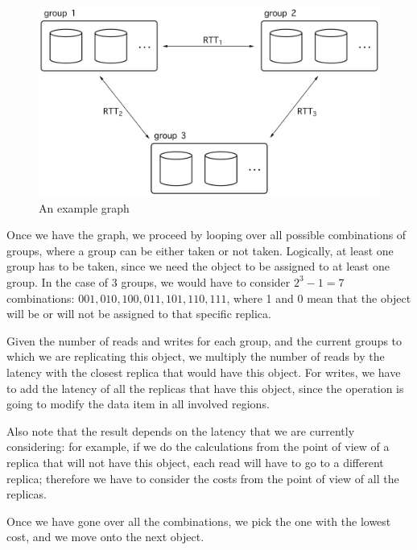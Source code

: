 \begin{figure}[!htb]
  \centering
  \includegraphics[width=\textwidth,height=\textheight,keepaspectratio]{img/graph.png}
  \caption{An example graph}
  \label{fig:graph}
\end{figure}

Once we have the graph, we proceed by looping over all possible combinations of groups, where a group can be either taken or not taken. Logically, at least one group has to be taken, since we need the object to be assigned to at least one group. In the case of 3 groups, we would have to consider $2^3 -1 = 7$ combinations: $001, 010, 100, 011, 101, 110, 111$, where 1 and 0 mean that the object will be or will not be assigned to that specific replica.

Given the number of reads and writes for each group, and the current groups to which we are replicating this object, we multiply the number of reads by the latency with the closest replica that would have this object. For writes, we have to add the latency of all the replicas that have this object, since the operation is going to modify the data item in all involved regions.

Also note that the result depends on the latency that we are currently considering: for example, if we do the calculations from the point of view of a replica that will not have this object, each read will have to go to a different replica; therefore we have to consider the costs from the point of view of all the replicas.

Once we have gone over all the combinations, we pick the one with the lowest cost, and we move onto the next object.

